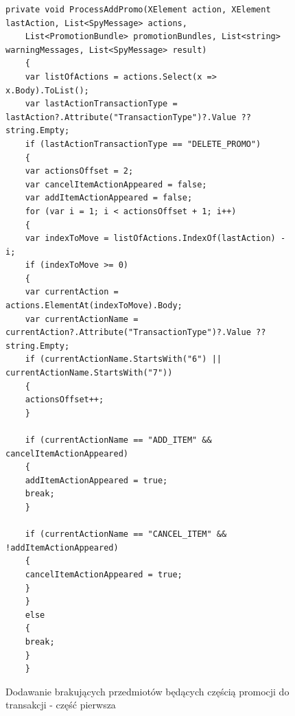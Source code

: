 \documentclass[a4paper]{book}
\begin{document}
\begin{figure}[t]
	\begin{lstlisting}[frame=single, breaklines=true]
	private void ProcessAddPromo(XElement action, XElement lastAction, List<SpyMessage> actions,
	List<PromotionBundle> promotionBundles, List<string> warningMessages, List<SpyMessage> result)
	{
	var listOfActions = actions.Select(x => x.Body).ToList();
	var lastActionTransactionType = lastAction?.Attribute("TransactionType")?.Value ?? string.Empty;
	if (lastActionTransactionType == "DELETE_PROMO")
	{
	var actionsOffset = 2;
	var cancelItemActionAppeared = false;
	var addItemActionAppeared = false;
	for (var i = 1; i < actionsOffset + 1; i++)
	{
	var indexToMove = listOfActions.IndexOf(lastAction) - i;
	if (indexToMove >= 0)
	{
	var currentAction = actions.ElementAt(indexToMove).Body;
	var currentActionName = currentAction?.Attribute("TransactionType")?.Value ?? string.Empty;
	if (currentActionName.StartsWith("6") || currentActionName.StartsWith("7"))
	{
	actionsOffset++;
	}
	
	if (currentActionName == "ADD_ITEM" && cancelItemActionAppeared)
	{
	addItemActionAppeared = true;
	break;
	}
	
	if (currentActionName == "CANCEL_ITEM" && !addItemActionAppeared)
	{
	cancelItemActionAppeared = true;
	}
	}
	else
	{
	break;
	}
	}
	\end{lstlisting}
	\caption{Dodawanie brakujących przedmiotów będących częścią promocji do transakcji - część pierwsza}
	\label{lst:brakujaceProdukty1}
\end{figure}
\end{document}
